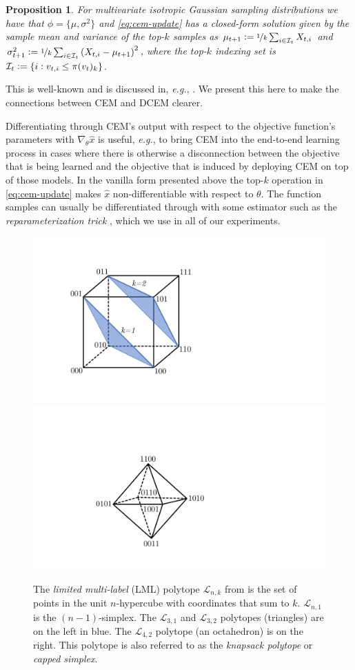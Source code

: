 \documentclass{article}
\newtheorem{proposition}{Proposition}
\newcommand{\eg}{{\it e.g.}\xspace}
\newcommand{\LML}{\ensuremath{\mathcal{L}}}
\begin{document}
\begin{proposition}
For multivariate isotropic Gaussian sampling distributions
we have that $\phi=\{\mu, \sigma^2\}$ and
\cref{eq:cem-update} has a closed-form solution
given by the sample mean and variance of the top-$k$ samples
as $\mu_{t+1}\vcentcolon= \nicefrac{1}{k} \sum_{i\in{\mathcal{I}}_t} X_{t,i}$
and $\sigma^2_{t+1}\vcentcolon= \nicefrac{1}{k} \sum_{i\in{\mathcal{I}}_t} \left(X_{t,i}-\mu_{t+1}\right)^2$,
where the top-$k$ indexing set is ${\mathcal{I}}_t\vcentcolon= \{i: v_{t,i} \leq \pi(v_t)_k\}$.
\label{prop:vanilla-cem}
\end{proposition}

This is well-known and is discussed in,
\eg, \citet{friedman2001elements}.
We present this here to make the connections
between CEM and DCEM clearer.

Differentiating through CEM's output with respect to the objective
function's parameters with $\nabla_\theta \hat x$ is useful, \eg,
to bring CEM into the end-to-end learning process in cases
where there is otherwise a disconnection between the objective
that is being learned and the objective that is induced by
deploying CEM on top of those models.
In the vanilla form presented above the
top-$k$ operation in \cref{eq:cem-update} makes $\hat x$
non-differentiable with respect to $\theta$.
The function samples can usually be differentiated through
with some estimator \citep{mohamed2019monte} such
as the \emph{reparameterization trick}
\citep{kingma2013auto,rezende2014stochastic,titsias2014doubly},
which we use in all of our experiments.

\begin{figure}[t]
  \centering
  \includegraphics[width=.24\textwidth]{polytopes/3.pdf}
  \hspace{-2mm}
  \includegraphics[width=.24\textwidth]{polytopes/4.pdf}
  \caption{
    The \emph{limited multi-label} (LML) polytope $\LML_{n,k}$ from
    \citet{amos2019limited}
    is the set of points in the unit
    $n$-hypercube with coordinates that sum to $k$.
    $\LML_{n,1}$ is the \mbox{$(n-1)$-simplex}.
    The $\LML_{3,1}$ and $\LML_{3,2}$ polytopes (triangles) are on the left
    in blue. The $\LML_{4,2}$ polytope (an octahedron) is on the right.
    This polytope is also referred to as the \emph{knapsack polytope}
    or \emph{capped simplex}.
  }
  \label{fig:lml-example}
\end{figure}
\end{document}
